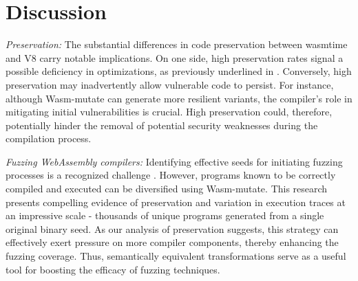 \documentclass[sigplan,screen]{acmart}
\newcommand*\badge[1]{ \colorbox{red}{\color{white}#1}}
\newcommand{\tool}{Wasm-mutate\xspace}
\newcommand{\Wasm}{WebAssembly\xspace}
\newcommand{\todo}[1]{%
\refstepcounter{todo}
\noindent\textbf{\badge{TODO}} {\color{red}#1}
\addcontentsline{td}{todo}
{\color{red}\thesection.\thetodo\xspace #1}}
\begin{document}











\section{Discussion}
\label{discussion}

\emph{Preservation:} The substantial differences in code preservation between wasmtime and V8 carry notable implications. 
On one side, high preservation rates signal a possible deficiency in optimizations, as previously underlined in \cite{wasmslim}. 
Conversely, high preservation may inadvertently allow vulnerable code to persist.
For instance, although \tool can generate more resilient variants, the compiler's role in mitigating initial vulnerabilities is crucial. 
High preservation could, therefore, potentially hinder the removal of potential security weaknesses during the compilation process.


\emph{Fuzzing \Wasm compilers:}  
Identifying effective seeds for initiating fuzzing processes is a recognized challenge \cite{7958599}. 
However, programs known to be correctly compiled and executed can be diversified using \tool.
This research presents compelling evidence of preservation and variation in execution traces at an impressive scale - thousands of unique programs generated from a single original binary seed. 
As our analysis of preservation suggests, this strategy can effectively exert pressure on more compiler components, thereby enhancing the fuzzing coverage.
Thus, semantically equivalent transformations serve as a useful tool for boosting the efficacy of fuzzing techniques.
\end{document}
